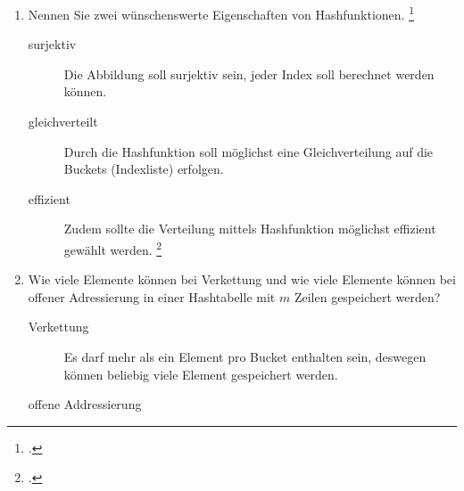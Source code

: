 \documentclass{bschlangaul-aufgabe}
\begin{document}

\begin{enumerate}


\item Nennen Sie zwei wünschenswerte Eigenschaften von Hashfunktionen.
\footcite{examen:66115:2021:03}

\begin{bAntwort}
\begin{description}
\item[surjektiv]

Die Abbildung soll surjektiv sein, \dh jeder Index soll berechnet werden
können.

\item[gleichverteilt]

Durch die Hashfunktion soll möglichst eine Gleichverteilung auf die
Buckets (Indexliste) erfolgen.

\item[effizient]

Zudem sollte die Verteilung mittels Hashfunktion möglichst effizient
gewählt werden.
\footcite{wiki:hashfunktion}
\end{description}
\end{bAntwort}


\item Wie viele Elemente können bei Verkettung und wie viele Elemente
können bei offener Adressierung in einer Hashtabelle mit $m$ Zeilen
gespeichert werden?

\begin{bAntwort}
\begin{description}
\item[Verkettung]

Es darf mehr als ein Element pro Bucket enthalten sein, deswegen können
beliebig viele Element gespeichert werden.

\item[offene Addressierung]


\end{description}
\end{bAntwort}
\end{enumerate}
\end{document}
